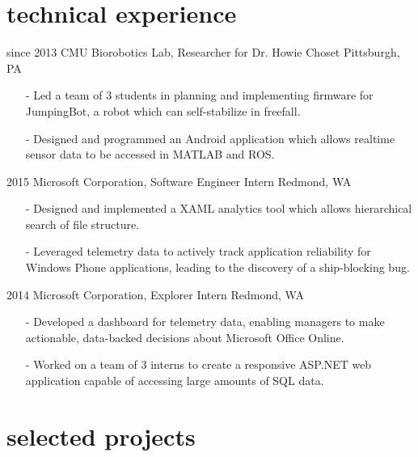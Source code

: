 \documentclass[]{friggeri-cv}
\begin{document}
    \section{technical experience}

    \begin{entrylist}
        \entrys
            {since 2013}
            {CMU Biorobotics Lab, {\normalfont Researcher for Dr. Howie Choset}}
            {Pittsburgh, PA}
            {\begin{itemize}[leftmargin=*]
                \item[-] Led a team of 3 students in planning and implementing firmware for JumpingBot, a robot which can self-stabilize in freefall.
                \item[-] Designed and programmed an Android application which allows realtime sensor data to be accessed in MATLAB and ROS.
            \end{itemize}}
        \entrys
            {2015}
            {Microsoft Corporation, {\normalfont Software Engineer Intern}}
            {Redmond, WA}
            {\begin{itemize}[leftmargin=*]
                \item[-] Designed and implemented a XAML analytics tool which allows hierarchical search of file structure.
                \item[-] Leveraged telemetry data to actively track application reliability for Windows Phone applications, leading to the discovery of a ship-blocking bug.
             \end{itemize}}
        \entrys
            {2014}
            {Microsoft Corporation, {\normalfont Explorer Intern}}
            {Redmond, WA}
            {\begin{itemize}[leftmargin=*]
                \item[-] Developed a dashboard for telemetry data, enabling managers to make actionable, data-backed decisions about Microsoft Office Online.
                \item[-] Worked on a team of 3 interns to create a responsive ASP.NET web application capable of accessing large amounts of SQL data.
             \end{itemize}}
    \end{entrylist}

    \section{selected projects}
\end{document}
